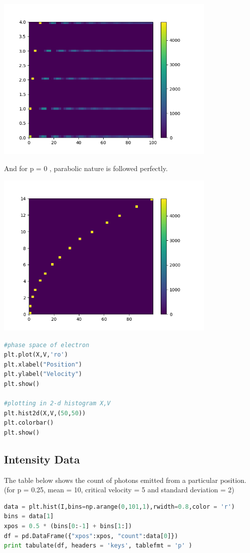 \documentclass[a4paper]{article}
\begin{document}
\begin{center}
\includegraphics[width=0.8\textwidth]{Figure_4-1.png}
\end{center}
And for p = 0 , parabolic nature is followed perfectly.
\begin{center}
\includegraphics[width=0.8\textwidth]{Figure_4-0.png}
\end{center}
\begin{lstlisting}[language=Python]
#phase space of electron
plt.plot(X,V,'ro')
plt.xlabel("Position")
plt.ylabel("Velocity")
plt.show()

#plotting in 2-d histogram X,V
plt.hist2d(X,V,(50,50))
plt.colorbar()
plt.show()
\end{lstlisting}

\subsection{Intensity Data}
The table below shows the count of photons emitted from a particular position.
(for p = 0.25, mean = 10, critical velocity = 5 and standard deviation = 2)
\begin{lstlisting}[language=Python]
data = plt.hist(I,bins=np.arange(0,101,1),rwidth=0.8,color = 'r')
bins = data[1]
xpos = 0.5 * (bins[0:-1] + bins[1:])
df = pd.DataFrame({"xpos":xpos, "count":data[0]})
print tabulate(df, headers = 'keys', tablefmt = 'p' )
\end{lstlisting}
\end{document}

